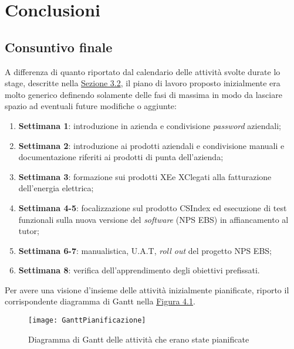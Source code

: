 
\chapter{Conclusioni}
\label{cap:conclusioni}
\section{Consuntivo finale}
\label{consuntivo}
A differenza di quanto riportato dal calendario delle attività svolte durate lo stage, descritte nella \hyperref[calendario]{Sezione 3.2}, il piano di lavoro proposto inizialmente era molto generico definendo solamente delle fasi di massima in modo da lasciare spazio ad eventuali future modifiche o aggiunte:

\begin{enumerate}
\item \textbf{Settimana 1}: introduzione in azienda e condivisione \textit{password} aziendali;
\item \textbf{Settimana 2}: introduzione ai prodotti aziendali e condivisione manuali e documentazione riferiti ai prodotti di punta dell'azienda;
\item \textbf{Settimana 3}: formazione sui prodotti XE\footnotemark[1] e XC\footnotemark[1] legati alla fatturazione dell'energia elettrica;
\item \textbf{Settimana 4-5}: focalizzazione sul prodotto CSIndex ed esecuzione di test funzionali sulla nuova versione del \textit{software} (NPS EBS) in affiancamento al tutor;
\item \textbf{Settimana 6-7}: manualistica, U.A.T\footnotemark[2],
 \textit{roll out} del progetto NPS EBS;
\item \textbf{Settimana 8}: verifica dell'apprendimento degli obiettivi prefissati.
\end{enumerate}

Per avere una visione d'insieme delle attività inizialmente pianificate, riporto il corrispondente \gls{diagramma di Gantt} nella \hyperref[gantt pianificazione]{Figura 4.1}.

\begin{figure}[h!]
\begin{center}
\texttt{[image: GanttPianificazione]} 
\caption{Diagramma di Gantt delle attività che erano state pianificate}
\label{gantt pianificazione}
\end{center}
\end{figure}
\FloatBarrier

